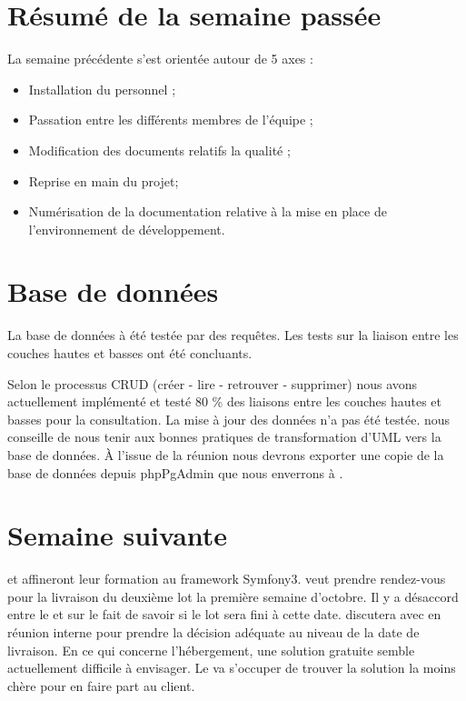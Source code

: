 \documentclass [a4paper] {article}
\begin{document}
\section{Résumé de la semaine passée}
La semaine précédente s'est orientée autour de 5 axes :  
\begin{itemize}
\item Installation du personnel ;
\item Passation entre les différents membres de l'équipe ;
\item Modification des documents relatifs la qualité ;
\item Reprise en main du projet;
\item Numérisation de la documentation relative à la mise en place de l'environnement de développement.
\end{itemize} 

\section{Base de données}
La base de données à été testée par des requêtes. Les tests sur la liaison entre les couches hautes et basses ont été concluants. 

Selon le processus CRUD (créer - lire - retrouver - supprimer) nous avons actuellement implémenté et testé 80 \% des liaisons entre les couches hautes et basses pour la consultation. La mise à jour des données n'a pas été testée. \nomTuteurPedago{} nous conseille de nous tenir aux bonnes pratiques de transformation d'UML vers la base de données. 
À l'issue de la réunion nous devrons exporter une copie de la base de données depuis phpPgAdmin que nous enverrons à \nomTuteurPedago{}.

\section{Semaine suivante}
\Francois{} et \Juliana{} affineront leur formation au framework Symfony3. 
\Pierre{} veut prendre rendez-vous pour la livraison du deuxième lot la première semaine d'octobre. Il y a désaccord entre le \RD{} et \Pierre{} sur le fait de savoir si le lot sera fini à cette date. \Pierre{} discutera avec \Julie{} en réunion interne pour prendre la décision adéquate au niveau de la date de livraison. En ce qui concerne l'hébergement, une solution gratuite semble actuellement difficile à envisager. Le \CP{} va s'occuper de trouver la solution la moins chère pour en faire part au client.
\end{document}
